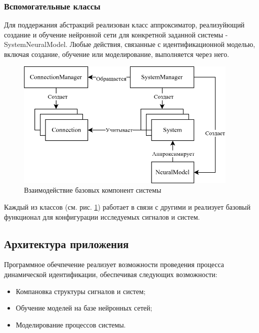 \subsubsection{Вспомогательные классы}

Для поддержания абстракций реализован класс аппроксиматор, реализуйющий
создание и обучение нейронной сети для конкретной заданной системы -
SystemNeuralModel. Любые действия, связанные с идентификационной моделью,
включая создание, обучение или моделирование, выполняется через него. 

\begin{figure}[H]
  \begin{center}
    \includegraphics[width=0.95\textwidth]{figures/basics_relations.png}
  \end{center}
  \caption{Взаимодействие базовых компонент системы}\label{fig:basics:components}
\end{figure}

Каждый из классов (см. рис. \ref{fig:basics:components}) работает в связи с
другими и реализует базовый функционал для конфигурации исследуемых сигналов и
систем.

\subsection{Архитектура приложения}

Программное обечпечение реализует возможности проведения процесса динамической
идентификации, обеспечивая следующих возможности:
\begin{itemize}
  \item Компановка структуры сигналов и систем;
  \item Обучение моделей на базе нейронных сетей;
  \item Моделирование процессов системы.
\end{itemize}

